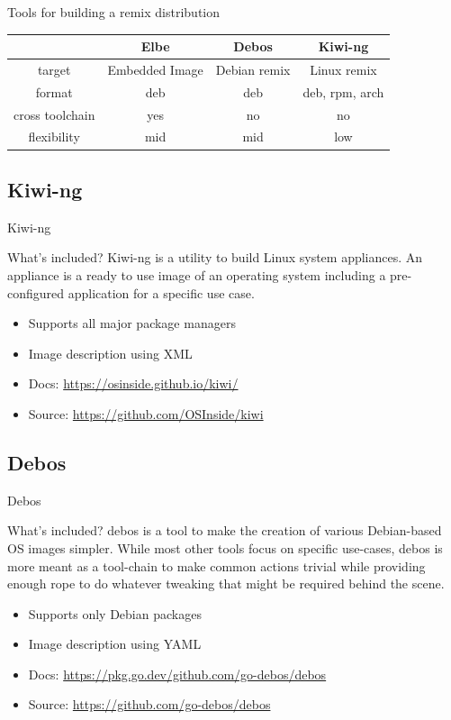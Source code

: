 \documentclass{beamer}
\begin{document}
\begin{frame}{Tools for building a remix distribution}
	\begin{tabular}{c|ccc}
		& \textbf{Elbe} & \textbf{Debos} & \textbf{Kiwi-ng} \\
		\hline
		target & Embedded Image & Debian remix & Linux remix \\ 
		format & deb & deb & deb, rpm, arch \\
		cross toolchain & yes & no & no \\
		flexibility & mid & mid & low \\
	\end{tabular}
\end{frame}

\subsection{Kiwi-ng}

\begin{frame}{Kiwi-ng}
	\begin{block}{What's included?} 
		Kiwi-ng is a utility to build Linux system appliances. 
		An appliance is a ready to use image of an operating system including a pre-configured application for a specific use case. 
	\end{block}

	\begin{itemize}
		\item Supports all major package managers
		\item Image description using XML
		\item Docs: \url{https://osinside.github.io/kiwi/}
		\item Source: \url{https://github.com/OSInside/kiwi}
	\end{itemize}
\end{frame}

\subsection{Debos}

\begin{frame}{Debos}
	\begin{block}{What's included?} 
		debos is a tool to make the creation of various Debian-based OS images simpler. While most other tools focus on specific use-cases, debos is more meant as a tool-chain to make common actions trivial while providing enough rope to do whatever tweaking that might be required behind the scene.
	\end{block}
	
	\begin{itemize}
		\item Supports only Debian packages
		\item Image description using YAML
		\item Docs: \url{https://pkg.go.dev/github.com/go-debos/debos}
		\item Source: \url{https://github.com/go-debos/debos}
	\end{itemize}
\end{frame}
\end{document}
